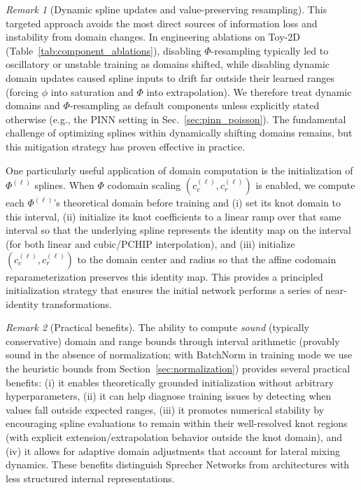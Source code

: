 \documentclass{article}
\theoremstyle{plain}
\theoremstyle{definition}
\theoremstyle{remark}
\newtheorem{remark}{Remark}
\begin{document}
\begin{remark}[Dynamic spline updates and value-preserving resampling]
This targeted approach avoids the most direct sources of information loss and instability from domain changes. In engineering ablations on Toy-2D (Table~\ref{tab:component_ablations}), disabling $\Phi$-resampling typically led to oscillatory or unstable training as domains shifted, while disabling dynamic domain updates caused spline inputs to drift far outside their learned ranges (forcing $\phi$ into saturation and $\Phi$ into extrapolation). We therefore treat dynamic domains and $\Phi$-resampling as default components unless explicitly stated otherwise (e.g., the PINN setting in Sec.~\ref{sec:pinn_poisson}). The fundamental challenge of optimizing splines within dynamically shifting domains remains, but this mitigation strategy has proven effective in practice.
\end{remark}

One particularly useful application of domain computation is the initialization of $\Phi^{(\ell)}$ splines. When $\Phi$ codomain scaling $(c_c^{(\ell)},c_r^{(\ell)})$ is enabled, we compute each $\Phi^{(\ell)}$'s theoretical domain before training and (i) set its knot domain to this interval, (ii) initialize its knot coefficients to a linear ramp over that same interval so that the underlying spline represents the identity map on the interval (for both linear and cubic/\textsc{PCHIP} interpolation), and (iii) initialize $(c_c^{(\ell)},c_r^{(\ell)})$ to the domain center and radius so that the affine codomain reparameterization preserves this identity map. This provides a principled initialization strategy that ensures the initial network performs a series of near-identity transformations.

\begin{remark}[Practical benefits]
The ability to compute \emph{sound} (typically conservative) domain and range bounds through interval arithmetic (provably sound in the absence of normalization; with BatchNorm in training mode we use the heuristic bounds from Section~\ref{sec:normalization}) provides several practical benefits: (i) it enables theoretically grounded initialization without arbitrary hyperparameters, (ii) it can help diagnose training issues by detecting when values fall outside expected ranges, (iii) it promotes numerical stability by encouraging spline evaluations to remain within their well-resolved knot regions (with explicit extension/extrapolation behavior outside the knot domain), and (iv) it allows for adaptive domain adjustments that account for lateral mixing dynamics. These benefits distinguish Sprecher Networks from architectures with less structured internal representations.
\end{remark}
\end{document}
